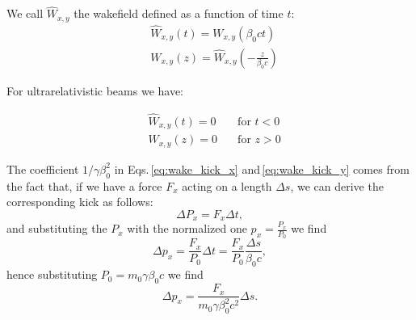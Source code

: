 We call $\widehat{W}_{x,y}$ the wakefield defined as a function of time $t$:
\begin{align}
    &\widehat{W}_{x,y}(t) = {W}_{x,y}\left(\beta_0 c t\right) \label{eq:wake_vs_t}\\
    &W_{x,y}(z) = \widehat{W}_{x,y}\left(-\frac{z}{\beta_0 c}\right) \label{eq:wake_vs_z}
\end{align}

For ultrarelativistic beams we have:

\begin{align}
    &\widehat{W}_{x,y}(t) = 0 \quad &\text{for } t < 0\\
    &W_{x,y}(z) = 0  \quad &\text{for } z > 0
\end{align}

The coefficient $1/\gamma\beta_0^2$ in Eqs.\,\ref{eq:wake_kick_x} and\,\ref{eq:wake_kick_y} comes from the fact that, if we have a force $F_x$ acting on a length $\Delta s$, we can derive the corresponding kick as follows:
\begin{equation}
    \Delta P_{x} = F_{x} \Delta t,
\end{equation}
and substituting the $P_{x}$ with the normalized one $p_{x} = \frac{P_{x}}{P_0}$ we find
\begin{equation}
    \Delta p_{x} = \frac{F_{x}}{P_0} \Delta t = \frac{F_{x}}{P_0}\frac{\Delta s }{\beta_0 c},
\end{equation}
hence substituting $P_0 = m_0 \gamma \beta_0 c$ we find
\begin{equation}
    \Delta p_{x} = \frac{F_{x}}{m_0 \gamma \beta_0^2 c^2} \Delta s.
\end{equation}



